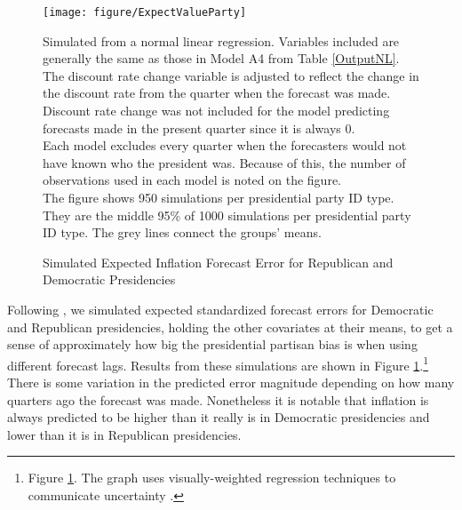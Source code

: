 \documentclass[a4paper]{article}
\begin{document}
\begin{figure}[t]
    \caption{Simulated Expected Inflation Forecast Error for Republican and Democratic Presidencies}
    \label{ExpectValueParty}
    \begin{center}

\begin{knitrout}
\color{fgcolor}

{\centering \texttt{[image: figure/ExpectValueParty]} 

}



\end{knitrout}





    \end{center}
    \begin{singlespace}
        {\scriptsize{Simulated from a normal linear regression. Variables included are generally the same as those in Model A4 from Table \ref{OutputNL}. The discount rate change variable is adjusted to reflect the change in the discount rate from the quarter when the forecast was made. Discount rate change was not included for the model predicting forecasts made in the present quarter since it is always 0. \\ Each model excludes every quarter when the forecasters would not have known who the president was. Because of this, the number of observations used in each model is noted on the figure. \\ The figure shows 950 simulations per presidential party ID type. They are the middle 95\% of 1000 simulations per presidential party ID type. The grey lines connect the groups' means.}}
    \end{singlespace}
\end{figure}

Following \cite{King2000}, we simulated expected standardized forecast errors for Democratic and Republican presidencies, holding the other covariates at their means, to get a sense of approximately how big the presidential partisan bias is when using different forecast lags. Results from these simulations are shown in Figure \ref{ExpectValueParty}.\footnote{Figure \ref{ExpectValueParty}. The graph uses visually-weighted regression techniques to communicate uncertainty \citep[see][]{Hsiang2012,Gandrud2013visual}.} There is some variation in the predicted error magnitude depending on how many quarters ago the forecast was made. Nonetheless it is notable that inflation is always predicted to be higher than it really is in Democratic presidencies and lower than it is in Republican presidencies.
\end{document}

